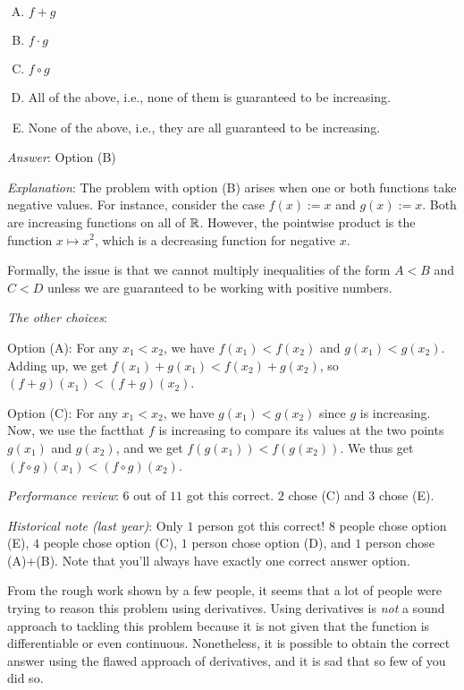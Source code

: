 \documentclass[10pt]{amsart}
\begin{document}
\begin{enumerate}
  \begin{enumerate}[(A)]

  \item $f + g$
  \item $f \cdot g$
  \item $f \circ g$
  \item All of the above, i.e., none of them is guaranteed to be increasing.
  \item None of the above, i.e., they are all guaranteed to be increasing.
  \end{enumerate}

  {\em Answer}: Option (B)

  {\em Explanation}: The problem with option (B) arises when one or
  both functions take negative values. For instance, consider the case
  $f(x) := x$ and $g(x) := x$. Both are increasing functions on all of
  $\mathbb{R}$. However, the pointwise product is the function $x \mapsto
  x^2$, which is a decreasing function for negative $x$.

  Formally, the issue is that we cannot multiply inequalities of the
  form $A < B$ and $C < D$ unless we are guaranteed to be working with
  positive numbers.

  {\em The other choices}:

  Option (A): For any $x_1 <
  x_2$, we have $f(x_1) < f(x_2)$ and $g(x_1) < g(x_2)$. Adding up, we
  get $f(x_1) + g(x_1) < f(x_2) + g(x_2)$, so $(f + g)(x_1) < (f + g)(x_2)$.

  Option (C): For any $x_1 < x_2$, we have $g(x_1) < g(x_2)$ since $g$
  is increasing. Now, we use the factthat $f$ is increasing to compare
  its values at the two points $g(x_1)$ and $g(x_2)$, and we get
  $f(g(x_1)) < f(g(x_2))$. We thus get $(f \circ g)(x_1) < (f \circ
  g)(x_2)$.

  {\em Performance review}: $6$ out of $11$ got this correct. $2$
  chose (C) and $3$ chose (E).

  {\em Historical note (last year)}: Only $1$ person got this correct!
  $8$ people chose option (E), $4$ people chose option (C), $1$ person
  chose option (D), and $1$ person chose (A)+(B). Note that you'll
  always have exactly one correct answer option.

  From the rough work shown by a few people, it
  seems that a lot of people were trying to reason this problem using
  derivatives. Using derivatives is {\em not} a sound approach to
  tackling this problem because it is not given that the function is
  differentiable or even continuous. Nonetheless, it is possible to
  obtain the correct answer using the flawed approach of derivatives,
  and it is sad that so few of you did so.


\end{enumerate}
\end{document}
